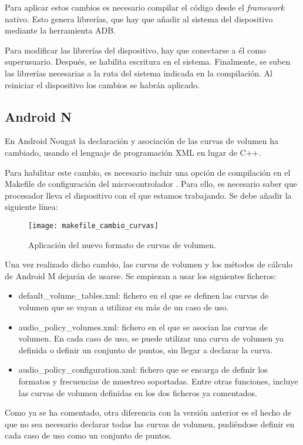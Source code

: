 Para aplicar estos cambios es necesario compilar el código desde el \textit{framework} nativo. Esto genera librerías, que hay que añadir al sistema del dispositivo mediante la herramienta \gls{ADB}. 

Para modificar las librerías del dispositivo, hay que conectarse a él como superusuario. Después, se habilita escritura en el sistema. Finalmente, se suben las librerías necesarias a la ruta del sistema indicada en la compilación. Al reiniciar el dispositivo los cambios se habrán aplicado.

\subsection{Android N}
En Android Nougat la declaración y asociación de las curvas de volumen ha cambiado, usando el lenguaje de programación XML en lugar de C++.

Para habilitar este cambio, es necesario incluir una opción de compilación en el Makefile de configuración del microcontrolador \cite{curves_android_n}. Para ello, es necesario saber que procesador lleva el dispositivo con el que estamos trabajando. Se debe añadir la siguiente línea:

\begin{figure}[H]
	\centering
	\texttt{[image: makefile\_cambio\_curvas]}
	\caption{Aplicación del nuevo formato de curvas de volumen.}
	\label{fig:mk_cambio_curvas}
\end{figure}

Una vez realizado dicho cambio, las curvas de volumen y los métodos de cálculo de Android M dejarán de usarse. Se empiezan a usar los siguientes ficheros:
\begin{itemize}
	\item{default\_volume\_tables.xml: fichero en el que se definen las curvas de volumen que se vayan a utilizar en más de un caso de uso.}
	\item{audio\_policy\_volumes.xml: fichero en el que se asocian las curvas de volumen. En cada caso de uso, se puede utilizar una curva de volumen ya definida o definir un conjunto de puntos, sin llegar a declarar la curva.}
	\item{audio\_policy\_configuration.xml: fichero que se encarga de definir los formatos y frecuencias de muestreo soportadas. Entre otras funciones, incluye las curvas de volumen definidas en los dos ficheros ya comentados.}
\end{itemize}

Como ya se ha comentado, otra diferencia con la versión anterior es el hecho de que no sea necesario declarar todas las curvas de volumen, pudiéndose definir en cada caso de uso como un conjunto de puntos.

